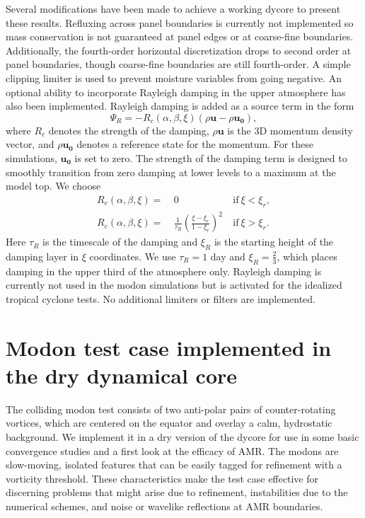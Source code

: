Several modifications have been made to achieve a working dycore to present these results.
Refluxing across panel boundaries is currently not implemented so mass conservation is not guaranteed at panel edges
or at coarse-fine boundaries. Additionally, the fourth-order horizontal discretization drops to second order
at panel boundaries, though coarse-fine boundaries are still fourth-order.
A simple clipping limiter is used to prevent moisture variables from going negative. An optional ability to
incorporate Rayleigh damping in the upper atmosphere has also been implemented. 
Rayleigh damping is added as a source term in the form
\begin{equation}
   \Psi_R = -R_c(\alpha,\beta, \xi)\left(\rho\mathbf{u} - \rho\mathbf{u_0}\right),
\end{equation}
where $R_c$ denotes the strength of the damping, $\rho\mathbf{u}$ is the 3D momentum density vector, and $\rho\mathbf{u_0}$ denotes
a reference state for the momentum. For these simulations, $\mathbf{u_0}$ is set to zero. The strength of the damping term
is designed to smoothly transition from zero damping at lower levels to a maximum at the model top. We choose
\begin{align}
   R_c(\alpha,\beta, \xi) = \ & 0 \ &  \mathrm{if} \ \xi < \xi_r, \\
   R_c(\alpha,\beta, \xi) = \  & \frac{1}{\tau_R}\left(\frac{\xi - \xi_r}{1-\xi_r}\right)^2 \ & \mathrm{if} \ \xi > \xi_r.
\end{align}
Here $\tau_R$ is the timescale of the damping and $\xi_R$ is the starting height of the damping layer in $\xi$ coordinates. We use
$\tau_R = 1$ day and $\xi_R = \frac{2}{3}$, which places damping in the upper third of the atmosphere only.
Rayleigh damping is currently not used in the modon simulations
but is activated for the idealized tropical cyclone tests. No additional limiters or filters are
implemented.


\section{Modon test case implemented in the dry dynamical core}
\label{sec:modon}
The \cite{lin2017colliding} colliding modon test consists of two anti-polar pairs of counter-rotating vortices, which are
centered on the equator and overlay a calm, hydrostatic background.
We implement it in a dry version of the dycore for use in some basic convergence studies and a
first look at the efficacy of AMR. The modons are slow-moving, isolated features that can be easily tagged for refinement
with a vorticity threshold. These characteristics make the test case effective for discerning problems that
might arise due to refinement, instabilities due to the numerical schemes, and
 noise or wavelike reflections at AMR boundaries.

